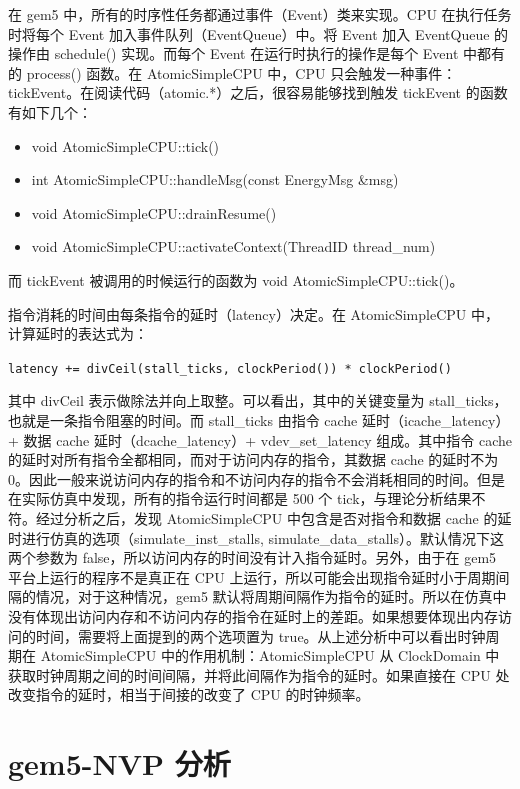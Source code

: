 \documentclass[a4paper,titlepage]{report}
\begin{document}
在 gem5 中，所有的时序性任务都通过事件（Event）类来实现。CPU 在执行任务时将每个 Event 加入事件队列（EventQueue）中。将 Event 加入 EventQueue 的操作由 schedule() 实现。而每个 Event 在运行时执行的操作是每个 Event 中都有的 process() 函数。在 AtomicSimpleCPU 中，CPU 只会触发一种事件： tickEvent。在阅读代码（atomic.*）之后，很容易能够找到触发 tickEvent 的函数有如下几个：
\begin{itemize}
\item{void AtomicSimpleCPU::tick()}
\item{int AtomicSimpleCPU::handleMsg(const EnergyMsg \&msg)}
\item{void AtomicSimpleCPU::drainResume()}
\item{void AtomicSimpleCPU::activateContext(ThreadID thread\_num)}
\end{itemize}
而 tickEvent 被调用的时候运行的函数为 void AtomicSimpleCPU::tick()。 

指令消耗的时间由每条指令的延时（latency）决定。在 AtomicSimpleCPU 中，计算延时的表达式为：
\begin{center}
\texttt{latency += divCeil(stall\_ticks, clockPeriod()) * clockPeriod()}
\end{center}
其中 divCeil 表示做除法并向上取整。可以看出，其中的关键变量为 stall\_ticks，也就是一条指令阻塞的时间。而 stall\_ticks 由指令 cache 延时（icache\_latency）+ 数据 cache 延时（dcache\_latency）+  vdev\_set\_latency 组成。其中指令 cache 的延时对所有指令全都相同，而对于访问内存的指令，其数据 cache 的延时不为 0。因此一般来说访问内存的指令和不访问内存的指令不会消耗相同的时间。但是在实际仿真中发现，所有的指令运行时间都是 500 个 tick，与理论分析结果不符。经过分析之后，发现 AtomicSimpleCPU 中包含是否对指令和数据 cache 的延时进行仿真的选项（simulate\_inst\_stalls, simulate\_data\_stalls）。默认情况下这两个参数为 false，所以访问内存的时间没有计入指令延时。另外，由于在 gem5 平台上运行的程序不是真正在 CPU 上运行，所以可能会出现指令延时小于周期间隔的情况，对于这种情况，gem5 默认将周期间隔作为指令的延时。所以在仿真中没有体现出访问内存和不访问内存的指令在延时上的差距。如果想要体现出内存访问的时间，需要将上面提到的两个选项置为 true。从上述分析中可以看出时钟周期在 AtomicSimpleCPU 中的作用机制：AtomicSimpleCPU 从 ClockDomain 中获取时钟周期之间的时间间隔，并将此间隔作为指令的延时。如果直接在 CPU 处改变指令的延时，相当于间接的改变了 CPU 的时钟频率。

\section{gem5-NVP 分析} \label{sec:nvp}
\end{document}
